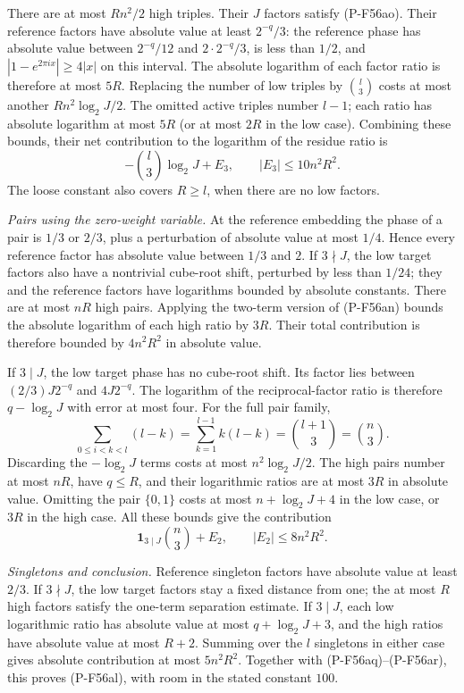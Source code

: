 There are at most $Rn^2/2$ high triples.
Their $J$ factors satisfy (P-F56ao). Their reference
factors have absolute value at least $2^{-q}/3$:
the reference phase has absolute value between
$2^{-q}/12$ and $2\cdot2^{-q}/3$, is less than $1/2$,
and $|1-e^{2\pi ix}|\ge4|x|$ on this interval.
The absolute logarithm of each factor ratio is therefore
at most $5R$. Replacing the number of low triples by
$\binom l3$ costs at most another $Rn^2\log_2 J/2$.
The omitted active triples number $l-1$; each ratio
has absolute logarithm at most $5R$ (or at most $2R$
in the low case). Combining these bounds, their net
contribution to the logarithm of the residue ratio is
\[
               -\binom l3\log_2 J+E_3,
                         \qquad |E_3|\le10n^2R^2.
 \tag{P-F56aq}
\]
The loose constant also covers $R\ge l$, when there
are no low factors.

\emph{Pairs using the zero-weight variable.}
At the reference embedding the phase of a pair is
$1/3$ or $2/3$, plus a perturbation of absolute value
at most $1/4$. Hence every reference factor has
absolute value between $1/3$ and $2$.
If $3\nmid J$, the low target factors also have a
nontrivial cube-root shift, perturbed by less than
$1/24$; they and the reference factors have logarithms
bounded by absolute constants.
There are at most $nR$ high pairs. Applying the
two-term version of (P-F56an) bounds the absolute
logarithm of each high ratio by $3R$.
Their total contribution is therefore bounded by
$4n^2R^2$ in absolute value.

If $3\mid J$, the low target phase has no cube-root
shift. Its factor lies between
$(2/3)J2^{-q}$ and $4J2^{-q}$.
The logarithm of the reciprocal-factor ratio is
therefore $q-\log_2 J$ with error at most four.
For the full pair family,
\[
 \sum_{0\le i<k<l}(l-k)
      =\sum_{k=1}^{l-1}k(l-k)
      =\binom{l+1}{3}=\binom n3.
\]
Discarding the $-\log_2 J$ terms costs at most
$n^2\log_2 J/2$. The high pairs number at most $nR$,
have $q\le R$, and their logarithmic ratios are at
most $3R$ in absolute value. Omitting the pair
$\{0,1\}$ costs at most $n+\log_2 J+4$ in the low
case, or $3R$ in the high case. All these bounds give
the contribution
\[
           \mathbf1_{3\mid J}\binom n3+E_2,
                         \qquad |E_2|\le8n^2R^2.
 \tag{P-F56ar}
\]

\emph{Singletons and conclusion.}
Reference singleton factors have absolute value at
least $2/3$. If $3\nmid J$, the low target factors
stay a fixed distance from one; the at most $R$
high factors satisfy the one-term separation estimate.
If $3\mid J$, each low logarithmic ratio has absolute
value at most $q+\log_2 J+3$, and the high ratios have
absolute value at most $R+2$.
Summing over the $l$ singletons in either case gives
absolute contribution at most $5n^2R^2$.
Together with (P-F56aq)--(P-F56ar), this proves
(P-F56al), with room in the stated constant $100$.

